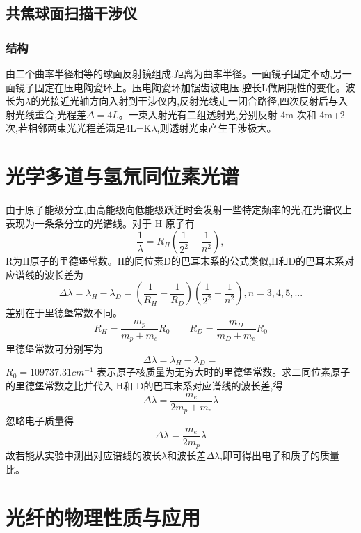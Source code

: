 \documentclass[12pt, a4paper]{article}
\begin{document}
\subsection{共焦球面扫描干涉仪}

\subsubsection{结构}
由二个曲率半径相等的球面反射镜组成,距离为曲率半径。一面镜子固定不动,另一面镜子固定在压电陶瓷环上。压电陶瓷环加锯齿波电压,腔长L做周期性的变化。波长为$\lambda$的光接近光轴方向入射到干涉仪内,反射光线走一闭合路径,四次反射后与入射光线重合,光程差$\Delta=4L$。一束入射光有二组透射光,分别反射 4m 次和 4m+2次,若相邻两束光光程差满足4L=K$\lambda$,则透射光束产生干涉极大。

\section{光学多道与氢氘同位素光谱}
由于原子能级分立,由高能级向低能级跃迁时会发射一些特定频率的光,在光谱仪上表现为一条条分立的光谱线。对于 H 原子有
\begin{equation}
 \frac{1}{\lambda} = R_H(\frac{1}{2^2} - \frac{1}{n^2}),
\end{equation}
R为H原子的里德堡常数。H的同位素D的巴耳末系的公式类似,H和D的巴耳末系对应谱线的波长差为
\begin{equation}
    \Delta \lambda = \lambda_H - \lambda_D = (\frac{1}{R_H} - \frac{1}{R_D})(\frac{1}{2^2} - \frac{1}{n^2}),n=3,4,5,...
\end{equation}
差别在于里德堡常数不同。
\begin{equation}
R_H = \frac{m_p}{m_p + m_e}R_0 \qquad
R_D = \frac{m_D}{m_D + m_e}R_0
\end{equation}
里德堡常数可分别写为
\begin{equation}
    \Delta \lambda = \lambda_H - \lambda_D =
\end{equation}
$R_0=109737.31cm^{-1}$ 表示原子核质量为无穷大时的里德堡常数。求二同位素原子的里德堡常数之比并代入 H和 D的巴耳末系对应谱线的波长差,得
\begin{equation}
    \Delta\lambda = \frac{m_e}{2m_p+m_e}\lambda
\end{equation}
忽略电子质量得
\begin{equation}
    \Delta\lambda=\frac{m_e}{2m_p}\lambda
\end{equation}
故若能从实验中测出对应谱线的波长$\lambda$和波长差$\Delta \lambda$,即可得出电子和质子的质量比。

\section{光纤的物理性质与应用}
\end{document}
